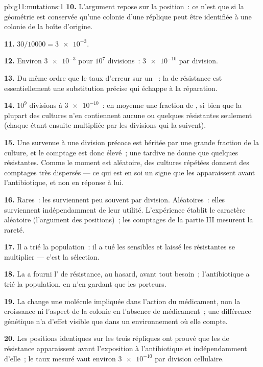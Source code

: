 \begin{solution}{pb:g11:mutations:1}
\textbf{10.} L'argument repose sur la position~: ce n'est que si la
géométrie est conservée qu'une colonie d'une réplique peut être
identifiée à une colonie de la boîte d'origine.

\textbf{11.} $30/\num{10000} = \num{3e-3}$.

\textbf{12.} Environ $\num{3e-3}$  pour $10^7$ divisions~:
$\num{3e-10}$ par division.

\textbf{13.} Du même ordre que le taux d'erreur sur un ~: la
 de résistance est essentiellement une substitution précise qui
échappe à la réparation.

\textbf{14.} $10^9$ divisions à $\num{3e-10}$~: en moyenne une fraction
de , si bien que la plupart des cultures n'en contiennent
aucune ou quelques  résistantes seulement (chaque 
étant ensuite multipliée par les divisions qui la suivent).

\textbf{15.} Une  survenue à une division précoce est héritée
par une grande fraction de la culture, et le comptage est donc élevé~;
une  tardive ne donne que quelques  résistantes. Comme
le moment est aléatoire, des cultures répétées donnent des comptages
très dispersés --- ce qui est en soi un signe que les 
apparaissent avant l'antibiotique, et non en réponse à lui.

\textbf{16.} Rares~: les  surviennent peu souvent par
division. Aléatoires~: elles surviennent indépendamment de leur
utilité. L'expérience établit le caractère aléatoire (l'argument des
positions)~; les comptages de la partie III mesurent la rareté.

\textbf{17.} Il a trié la population~: il a tué les  sensibles
et laissé les résistantes se multiplier --- c'est la sélection.

\textbf{18.} La  a fourni l' de résistance, au hasard,
avant tout besoin~; l'antibiotique a trié la population, en n'en
gardant que les porteurs.

\textbf{19.} La  change une molécule impliquée dans l'action du
médicament, non la croissance ni l'aspect de la colonie en l'absence de
médicament~; une différence génétique n'a d'effet visible que dans un
environnement où elle compte.

\textbf{20.} Les positions identiques sur les trois répliques ont
prouvé que les  de résistance apparaissent avant l'exposition
à l'antibiotique et indépendamment d'elle~; le taux mesuré vaut environ
$\num{3e-10}$ par division cellulaire.
\end{solution}
